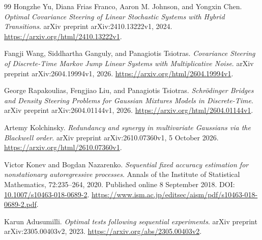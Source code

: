 \documentclass[UTF8,fontset=fandol,11pt,a4paper]{ctexart}
\theoremstyle{definition}
\theoremstyle{remark}
\numberwithin{equation}{section}
\begin{document}
\begin{thebibliography}{99}
 Hongzhe Yu, Diana Frias Franco, Aaron M. Johnson, and Yongxin Chen.
\emph{Optimal Covariance Steering of Linear Stochastic Systems with Hybrid Transitions}.
arXiv preprint arXiv:2410.13222v1, 2024.
\url{https://arxiv.org/html/2410.13222v1}.

 Fangji Wang, Siddhartha Ganguly, and Panagiotis Tsiotras.
\emph{Covariance Steering of Discrete-Time Markov Jump Linear Systems with Multiplicative Noise}.
arXiv preprint arXiv:2604.19994v1, 2026.
\url{https://arxiv.org/html/2604.19994v1}.

 George Rapakoulias, Fengjiao Liu, and Panagiotis Tsiotras.
\emph{Schr\"odinger Bridges and Density Steering Problems for Gaussian Mixtures Models in Discrete-Time}.
arXiv preprint arXiv:2604.01144v1, 2026.
\url{https://arxiv.org/html/2604.01144v1}.

 Artemy Kolchinsky.
\emph{Redundancy and synergy in multivariate Gaussians via the Blackwell order}.
arXiv preprint arXiv:2610.07360v1, 5 October 2026.
\url{https://arxiv.org/html/2610.07360v1}.

 Victor Konev and Bogdan Nazarenko.
\emph{Sequential fixed accuracy estimation for nonstationary autoregressive processes}.
Annals of the Institute of Statistical Mathematics, 72:235--264, 2020.
Published online 8 September 2018.
DOI: \href{https://doi.org/10.1007/s10463-018-0689-2}{10.1007/s10463-018-0689-2}.
\url{https://www.ism.ac.jp/editsec/aism/pdf/s10463-018-0689-2.pdf}.

 Karun Adusumilli.
\emph{Optimal tests following sequential experiments}.
arXiv preprint arXiv:2305.00403v2, 2023.
\url{https://arxiv.org/abs/2305.00403v2}.

\end{thebibliography}
\end{document}
